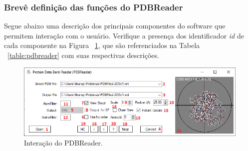 \documentclass[a4paper,12pt]{article}
\begin{document}
	\subsubsection*{Brevê definição das funções do PDBReader}
	Segue abaixo uma descrição dos principais componentes do software que permitem interação com o usuário. Verifique a presença dos identificador \textit{id} de cada componente na Figura ~\ref{fig:pdbreader}, que são referenciados na Tabela ~\ref{table:pdbreader} com suas respectivas descrições.
	
	\begin{figure}[H]
		\begin{center}
			\includegraphics[width=1\linewidth]{pdbreader.png}
		\end{center}
		\caption{Interação do PDBReader.}
		\label{fig:pdbreader}
	\end{figure}
	
\end{document}
